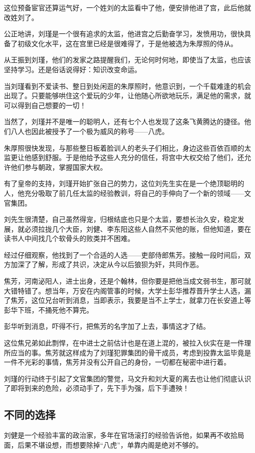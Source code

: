 \begin{multicols}{\theparacolNo}
这位预备宦官还算运气好，一个姓刘的太监看中了他，便安排他进了宫，此后他就改姓刘了。

公正地讲，刘瑾是一个很有追求的太监，他进宫之后勤奋学习，发愤用功，很快具备了初级文化水平，这在宫里已经是很难得了，于是他被选为朱厚照的侍从。

从王振到刘瑾，他们的发家之路提醒我们，无论何时何地，即使当了太监，也应该坚持学习。还是俗话说得好：知识改变命运。

当刘瑾看到不爱读书、整日到处闲逛的朱厚照时，他意识到，一个千载难逢的机会出现了。只要能够哄住这个爱玩的少年，让他随心所欲地玩乐，满足他的需求，就可以得到自己想要的一切！

当然了，刘瑾并不是唯一的聪明人，还有七个人也发现了这条飞黄腾达的捷径。他们八人也因此被授予了一个极为威风的称号——八虎。

朱厚照很快发现，与那些整日板着脸训人的老头子们相比，身边这些百依百顺的太监更让他感到舒服。于是他给予这些人充分的信任，将宫中大权交给了他们，还允许他们参与朝政，掌握国家大权。

有了皇帝的支持，刘瑾开始扩张自己的势力，这位刘先生实在是一个绝顶聪明的人，他充分吸取了前几任太监的经验教训，将自己的手伸向了一个新的领域——文官集团。

刘先生很清楚，自己虽然得宠，归根结底也只是个太监，要想长治久安，稳定发展，就必须拉拢几个大臣，刘健、李东阳这些人自然不买他的账，但他知道，要在读书人中间找几个软骨头的败类并不困难。

经过仔细观察，他找到了一个合适的人选——吏部侍郎焦芳。接触一段时间后，双方加深了了解，形成了共识，决定从今以后狼狈为奸，共同作恶。

焦芳，河南泌阳人，进士出身，还是个翰林，但你要是把他当成文弱书生，那可就大错特错了。想当年，万安在内阁管事的时候，大学士彭华推荐晋升学士人选，漏了焦芳，这位兄台听到消息，当即表示，我要是当不上学士，就拿刀在长安道上等彭华下班，不捅死他不算完。

彭华听到消息，吓得不行，把焦芳的名字加了上去，事情这才了结。

这位焦兄弟如此剽悍，在中进士之前估计也是在道上混的，被拉入伙实在是一件理所应当的事。焦芳就这样成为了刘瑾犯罪集团的骨干成员，考虑到投靠太监毕竟是一件不光彩的事情，焦芳并没有公开自己的身份，一切都在秘密中进行着。

刘瑾的行动终于引起了文官集团的警觉，马文升和刘大夏的离去也让他们彻底认识了即将到来的危险，必须动手了，先下手为强，后下手遭殃！

\subsection{不同的选择}
刘健是一个经验丰富的政治家，多年在官场滚打的经验告诉他，如果再不收拾局面，后果不堪设想，而想要除掉“八虎”，单靠内阁是绝对不够的。


\end{multicols}
